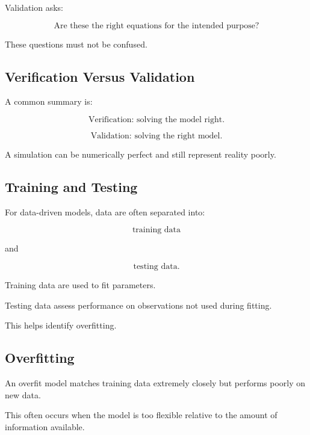 Validation asks:

\[
\boxed{
\text{Are these the right equations for the intended purpose?}
}
\]

These questions must not be confused.

\subsection{Verification Versus Validation}
\label{subsec:verification-versus-validation}

A common summary is:

\[
\boxed{
\text{Verification: solving the model right.}
}
\]

\[
\boxed{
\text{Validation: solving the right model.}
}
\]

A simulation can be numerically perfect and still represent reality poorly.

\subsection{Training and Testing}
\label{subsec:model-training-testing}

For data-driven models, data are often separated into:

\[
\boxed{
\text{training data}
}
\]

and

\[
\boxed{
\text{testing data}.
}
\]

Training data are used to fit parameters.

Testing data assess performance on observations not used during fitting.

This helps identify overfitting.

\subsection{Overfitting}
\label{subsec:model-overfitting}

An overfit model matches training data extremely closely but performs poorly
on new data.

This often occurs when the model is too flexible relative to the amount of
information available.

